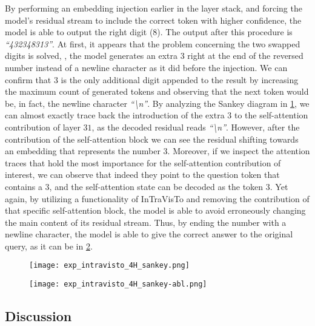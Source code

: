 By performing an embedding injection earlier in the layer stack, and forcing the model's residual stream to include the correct token with higher confidence, the model is  able to output the right digit ($8$).
The output after this procedure is \emph{``432348313''}.
At first, it appears that the problem concerning the two swapped digits is solved, , the model generates an extra $3$ right at the end of the reversed number instead of a newline character as it did before the injection.
We can confirm that $3$ is the only additional digit appended to the result by increasing the maximum count of generated tokens and observing that the next token would be, in fact, the newline character \emph{``\textbackslash{}n''}.
By analyzing the Sankey diagram in \cref{fig:exp_intravisto_4_H1}, we can almost exactly trace back the introduction of the extra $3$ to the self-attention contribution of layer $31$, as  the decoded residual reads \emph{``\textbackslash{}n''}.
However, after the contribution of the  self-attention block we can see the residual shifting towards an embedding that represents the number $3$.
Moreover, if we inspect the attention traces that hold the most importance for the self-attention contribution of interest, we can observe that indeed they point to the question token that contains a $3$, and the self-attention state  can be decoded as the token $3$.
Yet again, by utilizing a functionality of InTraVisTo and removing the contribution of that specific self-attention block, the model is able to avoid erroneously changing the main content of its residual stream.
Thus, by ending the number with a newline character, the model is able to give the correct answer to the original query, as it can be  in \cref{fig:exp_intravisto_4_H2}.

\begin{figure}[t!]
    \centering
    \texttt{[image: exp\_intravisto\_4H\_sankey.png]}
    \caption{}
    \label{fig:exp_intravisto_4_H1}
\end{figure}
\begin{figure}[t!]
    \centering
    \texttt{[image: exp\_intravisto\_4H\_sankey-abl.png]}
    \caption{}
    \label{fig:exp_intravisto_4_H2}
\end{figure}

\subsection{Discussion}

